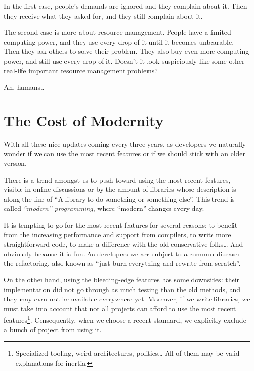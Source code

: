 \bigskip

In the first case, people's demands are ignored and they complain about
it. Then they receive what they asked for, and they still complain
about it.

The second case is more about resource management. People have a
limited computing power, and they use every drop of it until it
becomes unbearable. Then they ask others to solve their problem. They
also buy even more computing power, and still use every drop of
it. Doesn't it look suspiciously like some other real-life important
resource management problems?

\bigskip

Ah, humans…

\section{The Cost of Modernity}

With all these nice updates coming every three years, as \cpp{}
developers we naturally wonder if we can use the most recent features
or if we should stick with an older version.

There is a trend amongst us to push toward using the most recent
features, visible in online discussions or by the amount of libraries
whose description is along the line of ``A  library to do
something or something else''. This trend is called \emph{``modern''
  \cpp{} programming}, where ``modern'' changes every day.

It is tempting to go for the most recent features for several reasons:
to benefit from the increasing performance and support from compilers,
to write more straightforward code, to make a difference with the old
conservative folks… And obviously because it is fun. As developers we
are subject to a common disease: the refactoring, also known as ``just
burn everything and rewrite from scratch''.

On the other hand, using the bleeding-edge features has some
downsides: their implementation did not go through as much testing
than the old methods, and they may even not be available everywhere
yet. Moreover, if we write libraries, we must take into account that
not all projects can afford to use the most recent
features\footnote{Specialized tooling, weird architectures, politics…
  All of them may be valid explanations for inertia.}. Consequently,
when we choose a recent standard, we explicitly exclude a bunch of
project from using it.

